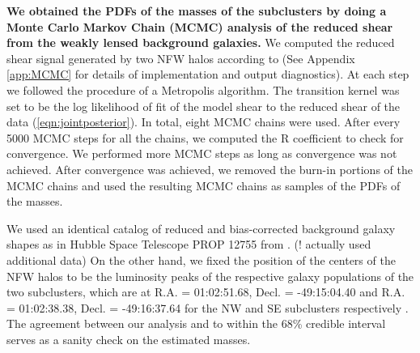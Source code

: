 
\textbf{We obtained the PDFs of the masses of the subclusters by doing a Monte
Carlo Markov Chain (MCMC) analysis of the reduced shear from the
weakly lensed background galaxies. } We computed the reduced shear signal
generated by two NFW halos according to \citet{Umetsu10} (See Appendix
\ref{app:MCMC} for
details of implementation and output diagnostics).
At each step we followed the procedure of a
Metropolis algorithm.  The transition kernel was set to
be the log likelihood of fit of the model shear to the reduced shear of the
data (\ref{eqn:jointposterior}).
In total, eight MCMC chains were used. After every 5000 MCMC steps for all
the chains, we computed the R coefficient \citep{Gelman92}  to
check for convergence. We performed more MCMC steps as long as convergence
was not achieved. After convergence was achieved, we removed the
burn-in portions of the MCMC chains and used the resulting MCMC chains as
samples of the PDFs of the masses. \par 
We used an identical catalog of reduced and bias-corrected background 
galaxy shapes as in Hubble Space Telescope PROP 12755 from
. (! \citealt{Jee13} actually used
additional data) On the other hand, we fixed the
position of the centers of the NFW halos to be  the luminosity peaks of the
respective galaxy populations of  the two subclusters, which are at R.A. = 01:02:51.68, Decl. = -49:15:04.40 and R.A. = 01:02:38.38, Decl. = -49:16:37.64 for the NW and SE subclusters
respectively .  The agreement between our analysis and  to within
the 68\% credible interval serves as a sanity check on the estimated masses. 
